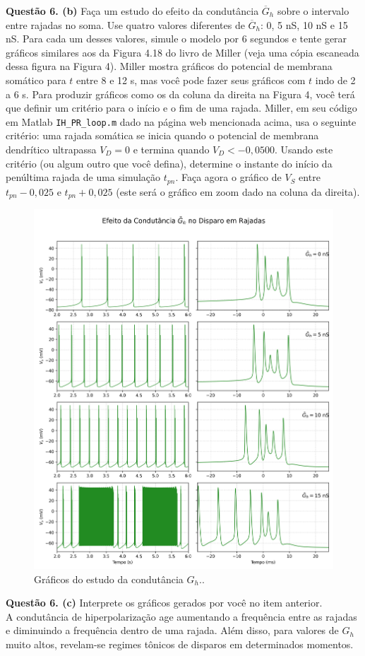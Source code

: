 \documentclass[english,11pt,a4paper]{article}
\begin{document}
	\noindent\textbf{Questão 6. (b)} Faça um estudo do efeito da condutância $\overline{G}_h$ sobre o intervalo entre rajadas no soma. Use quatro valores diferentes de $\overline{G}_h$: 0, 5 nS, 10 nS e 15 nS. Para cada um desses valores, simule o modelo por 6 segundos e tente gerar gráficos similares aos da Figura 4.18 do livro de Miller (veja uma cópia escaneada dessa figura na Figura 4). Miller mostra gráficos do potencial de membrana somático para $t$ entre 8 e 12 s, mas você pode fazer seus gráficos com $t$ indo de 2 a 6 s. Para produzir gráficos como os da coluna da direita na Figura 4, você terá que definir um critério para o início e o fim de uma rajada. Miller, em seu código em Matlab \texttt{IH\_PR\_loop.m} dado na página web mencionada acima, usa o seguinte critério: uma rajada somática se inicia quando o potencial de membrana dendrítico ultrapassa $V_D = 0$ e termina quando $V_D < -0{,}0500$. Usando este critério (ou algum outro que você defina), determine o instante do início da penúltima rajada de uma simulação $t_{pn}$. Faça agora o gráfico de $V_S$ entre $t_{pn} - 0{,}025$ e $t_{pn} + 0{,}025$ (este será o gráfico em zoom dado na coluna da direita).
	
	\begin{figure}[H]
		\centering
		\includegraphics[width=12cm]{../figures/ex_6b.png}
		\caption{Gráficos do estudo da condutância $G_h$..}
	\end{figure}
	
	\noindent\textbf{Questão 6. (c)} Interprete os gráficos gerados por você no item anterior.\\
	
	A condutância de hiperpolarização age aumentando a frequência entre as rajadas e diminuindo a frequência dentro de uma rajada. Além disso, para valores de $G_h$ muito altos, revelam-se regimes tônicos de disparos em determinados momentos. 
	
	
	
	
\end{document}
